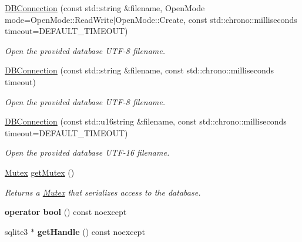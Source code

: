 \begin{DoxyCompactItemize}
\item 
\hyperlink{class_s_q_lite_1_1_d_b_connection_acc17774b1187ee5b9706398d5ed7786b}{D\-B\-Connection} (const std\-::string \&filename, Open\-Mode mode=Open\-Mode\-::\-Read\-Write$\vert$Open\-Mode\-::\-Create, const std\-::chrono\-::milliseconds timeout=D\-E\-F\-A\-U\-L\-T\-\_\-\-T\-I\-M\-E\-O\-U\-T)
\begin{DoxyCompactList}\small\item\em Open the provided database U\-T\-F-\/8 filename. \end{DoxyCompactList}\item 
\hyperlink{class_s_q_lite_1_1_d_b_connection_a62ddef495423a8da480a811c7f8bda1f}{D\-B\-Connection} (const std\-::string \&filename, const std\-::chrono\-::milliseconds timeout)
\begin{DoxyCompactList}\small\item\em Open the provided database U\-T\-F-\/8 filename. \end{DoxyCompactList}\item 
\hyperlink{class_s_q_lite_1_1_d_b_connection_a801e3c745e0236c2b55b91c47cc73da8}{D\-B\-Connection} (const std\-::u16string \&filename, const std\-::chrono\-::milliseconds timeout=D\-E\-F\-A\-U\-L\-T\-\_\-\-T\-I\-M\-E\-O\-U\-T)
\begin{DoxyCompactList}\small\item\em Open the provided database U\-T\-F-\/16 filename. \end{DoxyCompactList}\item 
\hypertarget{class_s_q_lite_1_1_d_b_connection_afd4961c42310aebf750d28d3487a9425}{\hyperlink{class_s_q_lite_1_1_mutex}{Mutex} \hyperlink{class_s_q_lite_1_1_d_b_connection_afd4961c42310aebf750d28d3487a9425}{get\-Mutex} ()}\label{class_s_q_lite_1_1_d_b_connection_afd4961c42310aebf750d28d3487a9425}

\begin{DoxyCompactList}\small\item\em Returns a \hyperlink{class_s_q_lite_1_1_mutex}{Mutex} that serializes access to the database. \end{DoxyCompactList}\item 
\hypertarget{class_s_q_lite_1_1_d_b_connection_a794e7d4d92aa19bd67f3cff4aaf50020}{{\bfseries operator bool} () const noexcept}\label{class_s_q_lite_1_1_d_b_connection_a794e7d4d92aa19bd67f3cff4aaf50020}

\item 
\hypertarget{class_s_q_lite_1_1_d_b_connection_a33f0b378dc147a3b2ff947e23994f71c}{sqlite3 $\ast$ {\bfseries get\-Handle} () const noexcept}\label{class_s_q_lite_1_1_d_b_connection_a33f0b378dc147a3b2ff947e23994f71c}


\end{DoxyCompactItemize}
